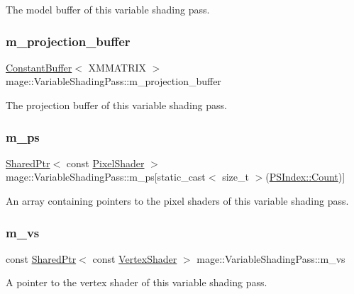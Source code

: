 The model buffer of this variable shading pass. \hypertarget{classmage_1_1_variable_shading_pass_afb777eb7b7303dd50337f361f82a919a}{}\label{classmage_1_1_variable_shading_pass_afb777eb7b7303dd50337f361f82a919a} 
\subsubsection{\texorpdfstring{m\+\_\+projection\+\_\+buffer}{m\_projection\_buffer}}
{\footnotesize\ttfamily \hyperlink{structmage_1_1_constant_buffer}{Constant\+Buffer}$<$ X\+M\+M\+A\+T\+R\+IX $>$ mage\+::\+Variable\+Shading\+Pass\+::m\+\_\+projection\+\_\+buffer\hspace{0.3cm}{\ttfamily [private]}}

The projection buffer of this variable shading pass. \hypertarget{classmage_1_1_variable_shading_pass_aacd5b6b967a0fcfe7510e289c3d630a0}{}\label{classmage_1_1_variable_shading_pass_aacd5b6b967a0fcfe7510e289c3d630a0} 
\subsubsection{\texorpdfstring{m\+\_\+ps}{m\_ps}}
{\footnotesize\ttfamily \hyperlink{namespacemage_a1e01ae66713838a7a67d30e44c67703e}{Shared\+Ptr}$<$ const \hyperlink{namespacemage_a27ecaf266420ee7a494d64edc0757129}{Pixel\+Shader} $>$ mage\+::\+Variable\+Shading\+Pass\+::m\+\_\+ps\mbox{[}static\+\_\+cast$<$ size\+\_\+t $>$(\hyperlink{classmage_1_1_variable_shading_pass_a49519e421ac5be93136d9efdbf075d4aae93f994f01c537c4e2f7d8528c3eb5e9}{P\+S\+Index\+::\+Count})\mbox{]}\hspace{0.3cm}{\ttfamily [private]}}

An array containing pointers to the pixel shaders of this variable shading pass. \hypertarget{classmage_1_1_variable_shading_pass_aa91a1e8628c2f671adadd919376aa67e}{}\label{classmage_1_1_variable_shading_pass_aa91a1e8628c2f671adadd919376aa67e} 
\subsubsection{\texorpdfstring{m\+\_\+vs}{m\_vs}}
{\footnotesize\ttfamily const \hyperlink{namespacemage_a1e01ae66713838a7a67d30e44c67703e}{Shared\+Ptr}$<$ const \hyperlink{classmage_1_1_vertex_shader}{Vertex\+Shader} $>$ mage\+::\+Variable\+Shading\+Pass\+::m\+\_\+vs\hspace{0.3cm}{\ttfamily [private]}}

A pointer to the vertex shader of this variable shading pass. 